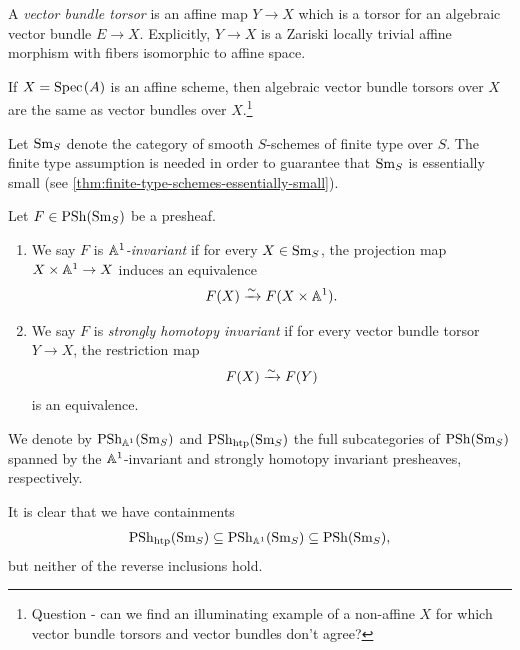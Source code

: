 \documentclass[11pt,openany]{book}
\renewcommand{\Pre}{\mathrm{PSh}}
\begin{document}
\begin{definition} \cite[4.2]{Weibel-KH}
A \textit{vector bundle torsor} is an affine map $Y \to X$ which is a torsor for an algebraic vector bundle $E \to X$. Explicitly, $Y \to X$ is a Zariski locally trivial affine morphism with fibers isomorphic to affine space.
\end{definition}

\begin{example} If $X = \text{Spec}\hspace{0.1em}(A)$ is an affine scheme, then algebraic vector bundle torsors over $X$ are the same as vector bundles over $X$.\footnote{%
Question - can we find an illuminating example of a non-affine $X$ for which vector bundle torsors and vector bundles don't agree?}
\end{example}


\begin{notation} Let $\mathrm{Sm}_S$ denote the category of smooth $S$-schemes of finite type over $S$. The finite type assumption is needed in order to guarantee that $\mathrm{Sm}_S$ is essentially small (see \autoref{thm:finite-type-schemes-essentially-small}).
\end{notation}


\begin{definition} Let $F \in \mathrm{PSh}(\mathrm{Sm}_S)$ be a presheaf.
\begin{enumerate}
    \item We say $F$ is $\mathbb{A}^1$\textit{-invariant} if for every $X \in \mathrm{Sm}_S$, the projection map $X \times \mathbb{A}^1 \to X$ induces an equivalence
    \begin{align*}
        F(X) \xrightarrow{\sim} F(X \times \mathbb{A}^1).
    \end{align*}
    \item We say $F$ is \textit{strongly homotopy invariant} if for every vector bundle torsor $Y \to X$, the restriction map
    \begin{align*}
        F(X) \xrightarrow{\sim} F(Y)
    \end{align*}
    is an equivalence.
\end{enumerate}
We denote by $\Pre_{\A^1}(\Sm_S)$ and $\Pre_{\htp}(\Sm_S)$ the full subcategories of $\Pre(\Sm_S)$ spanned by the $\mathbb{A}^1$-invariant and strongly homotopy invariant presheaves, respectively.
\end{definition}

\begin{remark} It is clear that we have containments
\begin{align*}
    \Pre_{\htp}(\Sm_S) \subseteq \Pre_{\A^1}(\Sm_S) \subseteq \Pre(\Sm_S),
\end{align*}
but neither of the reverse inclusions hold.
\end{remark}
\end{document}
